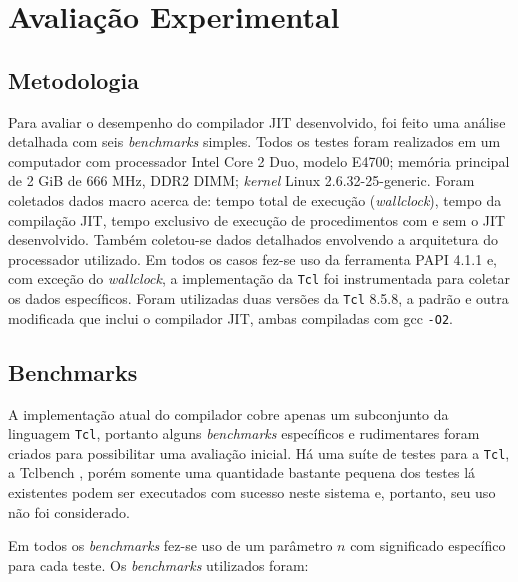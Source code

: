 \chapter{Avaliação Experimental}
\label{avaliacao}

\section{Metodologia}
\label{sec:metodologia}

Para avaliar o desempenho do compilador JIT desenvolvido, foi feito uma
análise detalhada com seis \textit{benchmarks} simples. Todos os
testes foram realizados em um computador com processador Intel Core 2
Duo, modelo E4700; memória principal de 2 GiB de 666 MHz, DDR2 DIMM;
\textit{kernel} Linux 2.6.32-25-generic. Foram coletados dados macro acerca
de: tempo total de execução (\textit{wallclock}),
tempo da compilação JIT, tempo exclusivo de execução de procedimentos
com e sem o JIT desenvolvido. Também coletou-se dados detalhados
envolvendo a arquitetura do processador utilizado.
Em todos os casos fez-se uso da ferramenta PAPI \cite{papisite} 4.1.1 e,
com exceção do \textit{wallclock}, a implementação da \texttt{Tcl} foi
instrumentada para coletar os dados específicos. Foram utilizadas duas
versões da \texttt{Tcl} 8.5.8, a padrão e outra modificada que inclui
o compilador JIT, ambas compiladas com gcc \verb!-O2!.


\section{Benchmarks}

A implementação atual do compilador cobre apenas um subconjunto
da linguagem \texttt{Tcl}, portanto alguns \textit{benchmarks}
específicos e rudimentares foram criados para possibilitar
uma avaliação inicial. Há uma suíte de testes para a \texttt{Tcl}, a Tclbench
\cite{tclbench-site}, porém somente uma quantidade bastante pequena dos
testes lá existentes podem ser executados com sucesso neste sistema e,
portanto, seu uso não foi considerado.

Em todos os \textit{benchmarks} fez-se uso de um parâmetro $n$ com
significado específico para cada teste. Os \textit{benchmarks}
utilizados foram:


